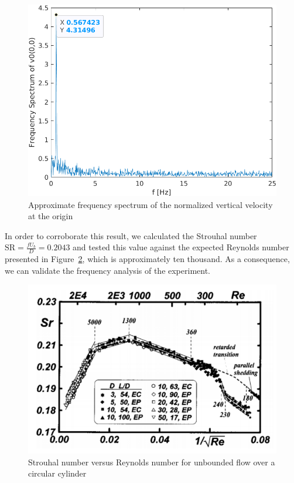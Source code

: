 \documentclass[12pt]{article}
\begin{document}
        \begin{figure}[ht!]
                \centering
                \includegraphics[width=\textwidth]{FFT_single.png}
                \caption{Approximate frequency spectrum of the normalized vertical velocity at the origin}
                \label{fig:fft_single}
        \end{figure}

        In order to corroborate this result, we calculated the Strouhal number $ \text{SR} = \frac{f U_b}{D} = 0.2043 $ and tested this value against the expected Reynolds number presented in Figure~\ref{fig:strouhal}, which is approximately ten thousand. As a consequence, we can validate the frequency analysis of the experiment.

        \begin{figure}[ht!]
                \centering
                \includegraphics[width=\textwidth]{Strouhal.png}
                \caption{Strouhal number versus Reynolds number for unbounded flow over a circular cylinder \cite{doi:10.1063/1.869675}}
                \label{fig:strouhal}
        \end{figure}
\end{document}
